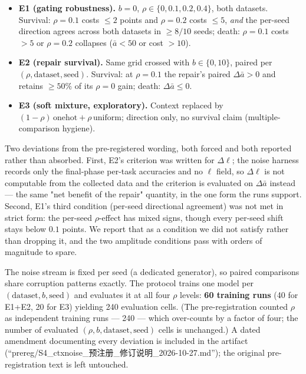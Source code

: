 \documentclass[review,12pt,number]{elsarticle}
\begin{document}
\begin{itemize}
\item \textbf{E1 (gating robustness).} $b{=}0$, $\rho \in
\{0, 0.1, 0.2, 0.4\}$, both datasets. Survival: $\rho{=}0.1$ costs
$\le 2$ points and $\rho{=}0.2$ costs $\le 5$, \emph{and} the
per-seed direction agrees across both datasets in $\ge 8/10$ seeds;
death: $\rho{=}0.1$ costs
$>5$ or $\rho{=}0.2$ collapses ($\bar a < 50$ or cost $>10$).
\item \textbf{E2 (repair survival).} Same grid crossed with
$b \in \{0, 10\}$, paired per $(\rho, \text{dataset}, \text{seed})$.
Survival: at $\rho{=}0.1$ the repair's paired $\Delta\bar a > 0$ and
retains $\ge 50\%$ of its $\rho{=}0$ gain; death: $\Delta\bar a \le 0$.
\item \textbf{E3 (soft mixture, exploratory).} Context replaced by
$(1-\rho)\,\mathrm{onehot} + \rho\,\mathrm{uniform}$; direction only,
no survival claim (multiple-comparison hygiene).
\end{itemize}

Two deviations from the pre-registered wording, both forced and both
reported rather than absorbed. First, E2's criterion was written for
$\Delta\ell$; the noise harness records only the final-phase
per-task accuracies and no $\ell$ field, so $\Delta\ell$ is not
computable from the collected data and the criterion is evaluated on
$\Delta\bar a$ instead --- the same "net benefit of the repair"
quantity, in the one form the runs support. Second, E1's third
condition (per-seed directional agreement) was not met in strict
form: the per-seed $\rho$-effect has mixed signs, though every
per-seed shift stays below $0.1$ points. We report that as a
condition we did not satisfy rather than dropping it, and the two
amplitude conditions pass with orders of magnitude to spare.

The noise stream is fixed per seed (a dedicated generator), so paired
comparisons share corruption patterns exactly. The protocol trains one
model per $(\text{dataset}, b, \text{seed})$ and evaluates it at all
four $\rho$ levels: \textbf{60 training runs} (40 for E1+E2, 20 for E3)
yielding 240 evaluation cells. (The pre-registration counted $\rho$ as
independent training runs --- 240 --- which over-counts by a factor of
four; the number of evaluated $(\rho, b, \text{dataset}, \text{seed})$
cells is unchanged.) A dated amendment documenting every deviation is
included in the artifact
(``prereg/S4\_ctxnoise\_预注册\_修订说明\_2026-10-27.md''); the original
pre-registration text is left untouched.
\end{document}
